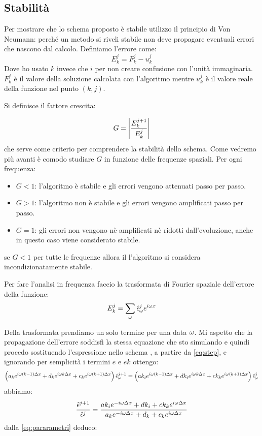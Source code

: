 \subsection{Stabilit\`a}
Per mostrare che lo schema proposto \`e stabile utilizzo il principio di Von Neumann:
perch\'e un metodo si riveli stabile non deve propagare eventuali errori che nascono dal calcolo. Definiamo l'errore come:
\begin{equation}
  E_k^j = F_k^j-u_k^j
\end{equation}
Dove ho usato $k$ invece che $i$ per non creare confusione con l'unit\`a immaginaria. $F_k^j$ \`e il valore della soluzione calcolata con l'algoritmo mentre $u_k^j$ \`e il valore reale della funzione nel punto $(k,j)$.

Si definisce il fattore  crescita:

\begin{equation}\label{eq:vonNeumannCrescita}
  G = \lr||{\frac{E^{j+1}_k}{E^j_k}}
\end{equation}
che serve come criterio per comprendere la stabilit\`a dello schema.
Come vedremo pi\`u avanti \`e comodo studiare $G$ in funzione delle frequenze spaziali. Per ogni frequenza:
\begin{itemize}
\item $G<1$:	l'algoritmo \`e  stabile e gli errori vengono attenuati passo per passo.
\item $G>1$:	l'algoritmo non \`e  stabile e gli errori vengono amplificati passo per passo.
\item $G=1$:	gli errori non vengono n\`e amplificati n\`e ridotti dall'evoluzione, anche in questo caso viene considerato stabile.
\end{itemize}
se $G<1$ per tutte le frequenze allora il l'algoritmo si considera incondizionatamente stabile.

Per fare l'analisi in frequenza faccio la trasformata di Fourier spaziale dell'errore della funzione:
\begin{equation}
  E_k^j = \sum_{\o} \hat{\epsilon}^j_\o e^{i\o x}
\end{equation}

Della trasformata prendiamo un solo termine per una data $\o$. Mi aspetto che la propagazione dell'errore soddisfi la stessa equazione che sto simulando e quindi procedo sostituendo l'espressione nello schema ,
a partire da \eqref{eq:step}, e ignorando per semplicit\`a i termini $e$ e $ek$ ottengo:
\begin{equation}
  \lrt{a_{k} e^{i\o (k- 1) \Delta x}+d_k e^{i\o k \Delta x} +c_{k}e^{i\o (k+1) \Delta x}} \hat{\epsilon}^{j+1}_\o= 
  \lrt{ak_i e^{i\o (k-1) \Delta x}+ dk_i e^{i\o k \Delta x} + ck_ke^{i\o (k+1) \Delta x}} \hat{\epsilon}^j_\o
\end{equation}
abbiamo:
\begin{equation}
  \frac{\hat{\epsilon}^{j+1}}{\hat{\epsilon}^j}= 
  \frac{ak_i e^{-i\o \Delta x}+ dk_i+ ck_ke^{i\o \Delta x}}{a_{k} e^{-i\o \Delta x}+d_k  +c_{k}e^{i\o\Delta x}}
\end{equation}
dalla \eqref{eq:pararametri} deduco:

